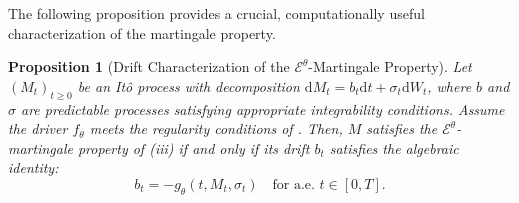 \documentclass[qian]{imsart}
\newcommand{\cEneutheta}{\mathcal{E}^{\theta}}
\newcommand{\dd}{\mathrm{d}}
\theoremstyle{plain}
\newtheorem{proposition}[theorem]{Proposition}
\theoremstyle{definition}
\begin{document}
The following proposition provides a crucial, computationally useful characterization of the martingale property.

\begin{proposition}[Drift Characterization of the $\cEneutheta$-Martingale Property]
\label{prop:drift_characterization_revised}
Let $(M_t)_{t\ge 0}$ be an Itô process with decomposition $\dd M_t = b_t \dd t + \sigma_t \dd W_t$, where $b$ and $\sigma$ are predictable processes satisfying appropriate integrability conditions. Assume the driver $f_\theta$ meets the regularity conditions of . Then, $M$ satisfies the $\cEneutheta$-martingale property of (iii) if and only if its drift $b_t$ satisfies the algebraic identity:
\begin{equation} \label{eq:drift_identity_revised}
    b_t = -g_\theta(t, M_t, \sigma_t) \quad \text{for a.e. } t \in [0,T].
\end{equation}
\end{proposition}
\end{document}
